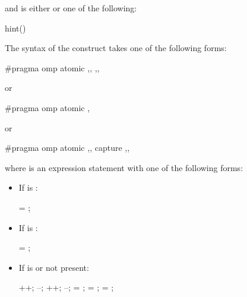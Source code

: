and  is either  or one of the following:

\begin{indentedcodelist}
hint()
\end{indentedcodelist}

\begin{ccppspecific}
The syntax of the  construct takes one of the following forms:

\begin{ompcPragma}
#pragma omp atomic \plc{[clause[[[},\plc{] clause] ... ] [},\plc{]]} 
                   \plc{[[},\plc{] clause [[[},\plc{] clause] ... ]]} 
\end{ompcPragma}

or

\begin{ompcPragma}
#pragma omp atomic \plc{[clause[[},\plc{] clause] ... ]} 
\end{ompcPragma}

or

\begin{ompcPragma}
#pragma omp atomic \plc{[clause[[[},\plc{] clause] ... ] [},\plc{]]} capture
                   \plc{[[},\plc{] clause [[[},\plc{] clause] ... ]]} 
\end{ompcPragma}

where  is an expression statement with one of the following forms:

\begin{itemize}
\item If  is :
\begin{ompSyntax}
 = ;
\end{ompSyntax}

\item If  is :
\begin{ompSyntax}
 = ;
\end{ompSyntax}

\item If  is  or not present:
\begin{ompSyntax}
++;
--;
++;
--;
 = ;
 =   ;
 =   ;
\end{ompSyntax}


\end{itemize}
\end{ccppspecific}
